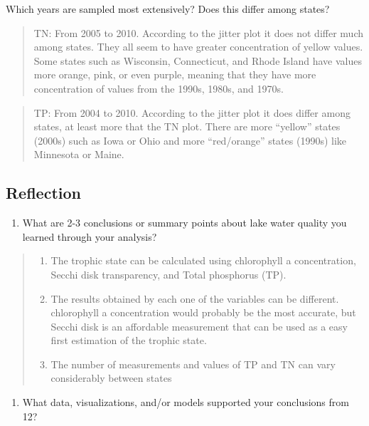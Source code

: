 \documentclass[]{article}
\providecommand{\tightlist}{%
  \setlength{\itemsep}{0pt}\setlength{\parskip}{0pt}}
\begin{document}
Which years are sampled most extensively? Does this differ among states?

\begin{quote}
TN: From 2005 to 2010. According to the jitter plot it does not differ
much among states. They all seem to have greater concentration of yellow
values. Some states such as Wisconsin, Connecticut, and Rhode Island
have values more orange, pink, or even purple, meaning that they have
more concentration of values from the 1990s, 1980s, and 1970s.
\end{quote}

\begin{quote}
TP: From 2004 to 2010. According to the jitter plot it does differ among
states, at least more that the TN plot. There are more ``yellow'' states
(2000s) such as Iowa or Ohio and more ``red/orange'' states (1990s) like
Minnesota or Maine.
\end{quote}

\hypertarget{reflection}{%
\subsection{Reflection}\label{reflection}}

\begin{enumerate}
\def\labelenumi{\arabic{enumi}.}
\setcounter{enumi}{11}
\tightlist
\item
  What are 2-3 conclusions or summary points about lake water quality
  you learned through your analysis?
\end{enumerate}

\begin{quote}
\begin{enumerate}
\def\labelenumi{\arabic{enumi}.}
\tightlist
\item
  The trophic state can be calculated using chlorophyll a concentration,
  Secchi disk transparency, and Total phosphorus (TP).
\item
  The results obtained by each one of the variables can be different.
  chlorophyll a concentration would probably be the most accurate, but
  Secchi disk is an affordable measurement that can be used as a easy
  first estimation of the trophic state.
\item
  The number of measurements and values of TP and TN can vary
  considerably between states
\end{enumerate}
\end{quote}

\begin{enumerate}
\def\labelenumi{\arabic{enumi}.}
\setcounter{enumi}{12}
\tightlist
\item
  What data, visualizations, and/or models supported your conclusions
  from 12?
\end{enumerate}
\end{document}
